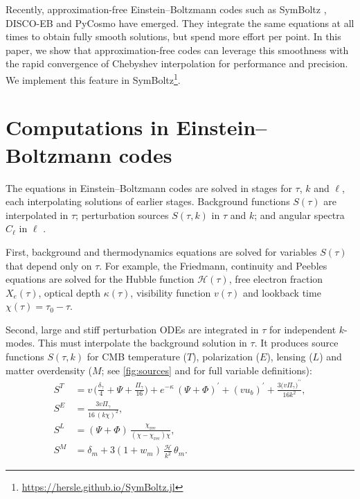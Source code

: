 \documentclass{aa}
\newcommand\EB{Einstein–Boltzmann}
\newcommand\scrH{\mathscr{H}}
\begin{document}
Recently, approximation-free \EB{} codes such as SymBoltz \citep{sletmoenSymBoltzjlSymbolicnumericApproximationfree2026a}, DISCO-EB \citep{hahnDISCODJDifferentiableEinsteinBoltzmann2024} and PyCosmo \citep{refregierPyCosmoIntegratedCosmological2018} have emerged.
They integrate the same equations at all times to obtain fully smooth solutions, but spend more effort per point.
In this paper, we show that approximation-free codes can leverage this smoothness with the rapid convergence of Chebyshev interpolation for performance and precision.
We implement this feature in SymBoltz\footnote{\url{https://hersle.github.io/SymBoltz.jl}}.

\section{Computations in \EB{} codes}
\label{sec:sources}

The equations in \EB{} codes are solved in stages for $\tau$, $k$ and $\ell$,
each interpolating solutions of earlier stages.
Background functions $S(\tau)$ are interpolated in $\tau$;
perturbation sources $S(\tau, k)$ in $\tau$ and $k$;
and angular spectra $C_\ell$ in $\ell$ \citep[e.g.][]{callinHowCalculateCMB2006c}.

First, background and thermodynamics equations are solved for variables $S(\tau)$ that depend only on $\tau$.
For example, the Friedmann, continuity and Peebles equations are solved for the Hubble function $\scrH(\tau)$, free electron fraction $X_e(\tau)$, optical depth $\kappa(\tau)$, visibility function $v(\tau)$ and lookback time $\chi(\tau) = \tau_0 - \tau$.

Second, large and stiff perturbation ODEs are integrated in $\tau$ for independent $k$-modes.
This must interpolate the background solution in $\tau$.
It produces source functions $S(\tau, k)$ for CMB temperature ($T$), polarization ($E$), lensing ($L$) and matter overdensity ($M$; see \cref{fig:sources} and \cite{sletmoenSymBoltzjlSymbolicnumericApproximationfree2026a} for full variable definitions):%
\begin{subequations}
	\begin{align}
		S^T    & = v \, \Bigg(\frac{\delta_\gamma}{4} + \Psi + \frac{\Pi_\gamma}{16}\Bigg) + e^{-\kappa} \, (\Psi + \Phi)^\prime + (v u_b)^\prime + \frac{3\big(v \Pi_\gamma\big)^{\prime\prime}}{16 k^2}, \\
		S^E    & = \frac{3 v \Pi_\gamma}{16 \, (k \chi)^2}, \\
		S^L    & = (\Psi+\Phi) \, \frac{\chi_\text{rec}}{(\chi-\chi_\text{rec}) \chi}, \\
		S^M    & = \delta_m + 3 (1+w_m) \, \frac{\scrH}{k^2} \, \theta_m .
	\end{align}
	\label{eq:sources}%
\end{subequations}
\end{document}
